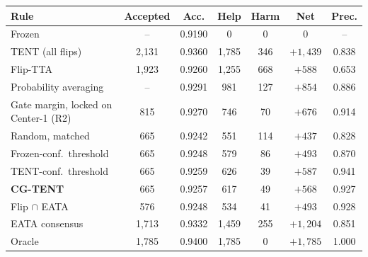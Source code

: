 \begin{tabular}{@{}lcccccc@{}}
\toprule
Rule & Accepted & Acc. & Help & Harm & Net & Prec. \\
\midrule
Frozen & -- & 0.9190 & 0 & 0 & 0 & -- \\
TENT (all flips) & 2,131 & 0.9360 & 1,785 & 346 & $+1{,}439$ & 0.838 \\
Flip-TTA & 1,923 & 0.9260 & 1,255 & 668 & $+588$ & 0.653 \\
Probability averaging & -- & 0.9291 & 981 & 127 & $+854$ & 0.886 \\
Gate margin, locked on Center-1 (R2) & 815 & 0.9270 & 746 & 70 & $+676$ & 0.914 \\
\midrule
Random, matched & 665 & 0.9242 & 551 & 114 & $+437$ & 0.828 \\
Frozen-conf.\ threshold & 665 & 0.9248 & 579 & 86 & $+493$ & 0.870 \\
TENT-conf.\ threshold & 665 & 0.9259 & 626 & 39 & $+587$ & 0.941 \\
\textbf{CG-TENT} & 665 & 0.9257 & 617 & 49 & $+568$ & 0.927 \\
Flip $\cap$ EATA & 576 & 0.9248 & 534 & 41 & $+493$ & 0.928 \\
EATA consensus & 1,713 & 0.9332 & 1,459 & 255 & $+1{,}204$ & 0.851 \\
Oracle & 1,785 & 0.9400 & 1,785 & 0 & $+1{,}785$ & 1.000 \\
\bottomrule
\end{tabular}
